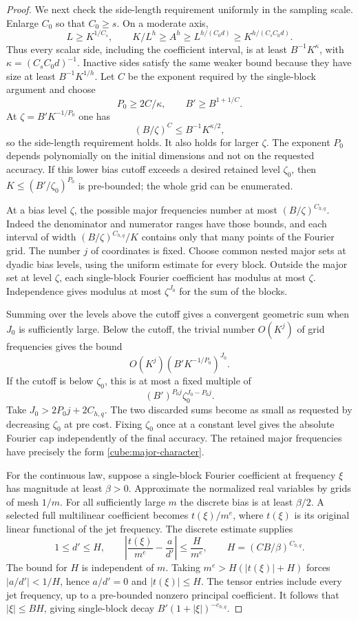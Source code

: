 \begin{proof}
We next check the side-length requirement uniformly in the
sampling scale. Enlarge $C_0$ so that $C_0\ge s$. On a
moderate axis,
\[
 L\ge K^{1/C_s},\qquad
 K/L^h\ge A^h\ge L^{h/(C_0d)}
                 \ge K^{h/(C_sC_0d)}.
\]
Thus every scalar side, including the coefficient interval,
is at least $B^{-1}K^\kappa$, with
$\kappa=(C_sC_0d)^{-1}$. Inactive sides satisfy the same
weaker bound because they have size at least
$B^{-1}K^{1/h}$. Let $C$ be the exponent required by the
single-block argument and choose
\[
                   P_0\ge2C/\kappa,
                   \qquad B'\ge B^{1+1/C}.
\]
At $\zeta=B'K^{-1/P_0}$ one has
\[
                 (B/\zeta)^C\le B^{-1}K^{\kappa/2},
\]
so the side-length requirement holds. It also holds for
larger $\zeta$. The exponent $P_0$ depends polynomially on
the initial dimensions and not on the requested accuracy.
If this lower bias cutoff exceeds a desired retained level
$\zeta_0$, then $K\le(B'/\zeta_0)^{P_0}$ is pre-bounded;
the whole grid can be enumerated.

At a bias level $\zeta$, the possible major frequencies
number at most $(B/\zeta)^{C_{h,q}}$. Indeed the denominator
and numerator ranges have those bounds, and each interval of
width $(B/\zeta)^{C_{h,q}}/K$ contains only that many points
of the Fourier grid. The number $j$ of coordinates is fixed.
Choose common nested major sets at dyadic bias levels, using
the uniform estimate for every block. Outside the major set
at level $\zeta$, each single-block Fourier coefficient has
modulus at most $\zeta$. Independence gives modulus at most
$\zeta^{J_0}$ for the sum of the blocks.

Summing over the levels above the cutoff gives a convergent
geometric sum when $J_0$ is sufficiently large. Below the
cutoff, the trivial number $O(K^j)$ of grid frequencies gives
the bound
\[
                    O(K^j)(B'K^{-1/P_0})^{J_0}.
\]
If the cutoff is below $\zeta_0$, this is at most a fixed
multiple of
\[
                 (B')^{P_0j}\zeta_0^{J_0-P_0j}.
\]
Take $J_0>2P_0j+2C_{h,q}$. The two discarded sums become
as small as requested by decreasing $\zeta_0$ at pre cost.
Fixing $\zeta_0$ once at a constant level gives the absolute
Fourier cap independently of the final accuracy. The retained
major frequencies have precisely the form
\eqref{cube:major-character}.

For the continuous law, suppose a single-block Fourier
coefficient at frequency $\xi$ has magnitude at least
$\beta>0$. Approximate the normalized real variables by
grids of mesh $1/m$. For all sufficiently large $m$ the
discrete bias is at least $\beta/2$. A selected full
multilinear coefficient becomes $t(\xi)/m^e$, where
$t(\xi)$ is its original linear functional of the jet
frequency. The discrete estimate supplies
\[
 1\le d'\le H,\qquad
 \left|\frac{t(\xi)}{m^e}-\frac{a}{d'}\right|
       \le\frac{H}{m^e},\qquad
 H=(CB/\beta)^{C_{h,q}}.
\]
The bound for $H$ is independent of $m$. Taking
$m^e>H(|t(\xi)|+H)$ forces $|a/d'|<1/H$, hence $a/d'=0$
and $|t(\xi)|\le H$. The tensor entries include every jet
frequency, up to a pre-bounded nonzero principal coefficient.
It follows that $|\xi|\le BH$, giving single-block decay
$B'(1+|\xi|)^{-c_{h,q}}$.


\end{proof}
